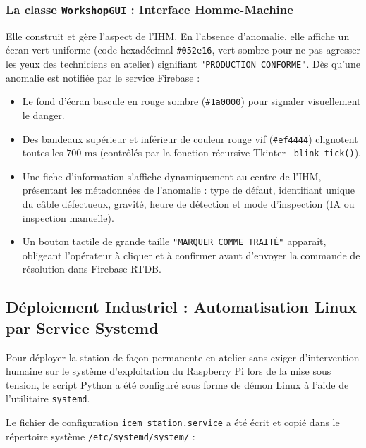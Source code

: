 \subsubsection{La classe \texttt{WorkshopGUI} : Interface Homme-Machine}

Elle construit et gère l'aspect de l'IHM. En l'absence d'anomalie, elle affiche un écran vert uniforme (code hexadécimal \texttt{\#052e16}, vert sombre pour ne pas agresser les yeux des techniciens en atelier) signifiant \texttt{"PRODUCTION CONFORME"}.
Dès qu'une anomalie est notifiée par le service Firebase :
\begin{itemize}
    \item Le fond d'écran bascule en rouge sombre (\texttt{\#1a0000}) pour signaler visuellement le danger.
    \item Des bandeaux supérieur et inférieur de couleur rouge vif (\texttt{\#ef4444}) clignotent toutes les $700\text{ ms}$ (contrôlés par la fonction récursive Tkinter \texttt{\_blink\_tick()}).
    \item Une fiche d'information s'affiche dynamiquement au centre de l'IHM, présentant les métadonnées de l'anomalie : type de défaut, identifiant unique du câble défectueux, gravité, heure de détection et mode d'inspection (IA ou inspection manuelle).
    \item Un bouton tactile de grande taille \texttt{"MARQUER COMME TRAITÉ"} apparaît, obligeant l'opérateur à cliquer et à confirmer avant d'envoyer la commande de résolution dans Firebase RTDB.
\end{itemize}

\subsection{Déploiement Industriel : Automatisation Linux par Service Systemd}

Pour déployer la station de façon permanente en atelier sans exiger d'intervention humaine sur le système d'exploitation du Raspberry Pi lors de la mise sous tension, le script Python a été configuré sous forme de démon Linux à l'aide de l'utilitaire \texttt{systemd}.

Le fichier de configuration \texttt{icem\_station.service} a été écrit et copié dans le répertoire système \texttt{/etc/systemd/system/} :

